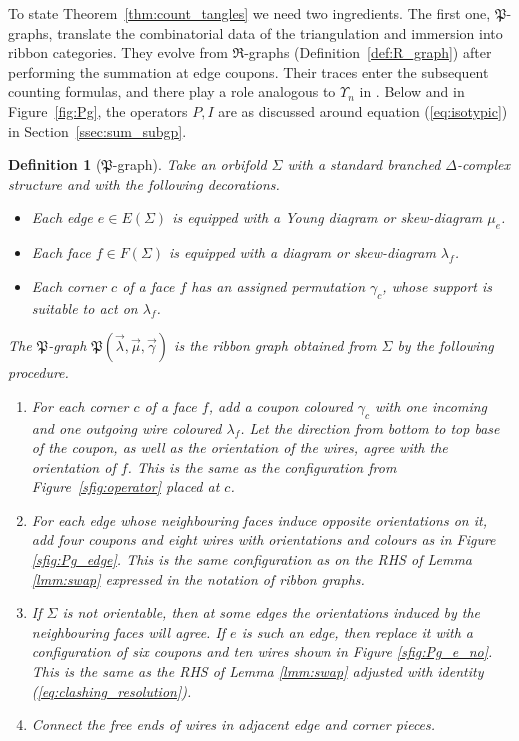 \documentclass{amsart}
\newtheorem{definition}[conjecture]{Definition}
\begin{document}
To state Theorem~\ref{thm:count_tangles} we need two ingredients. The first one, $\mathfrak{P}$-graphs, translate the combinatorial data of the triangulation and immersion into ribbon categories. They evolve from $\mathfrak{R}$-graphs (Definition~\ref{def:R_graph}) after performing the summation at edge coupons. Their traces enter the subsequent counting formulas, and there play a role analogous to $\Upsilon_n$ in \cite[Proposition 5.8]{asymptotic_stats_random_covering_surfaces_MageePuder23}. Below and in Figure~\ref{fig:Pg}, the operators $P,I$ are as discussed around equation (\ref{eq:isotypic}) in Section~\ref{ssec:sum_subgp}.
\begin{definition}[$\mathfrak{P}$-graph]\label{def:P_graph}
Take an orbifold $\Sigma$ with a standard branched $\Delta$-complex structure and with the following decorations.
\begin{itemize}
\item Each edge $e\in E(\Sigma)$ is equipped with a Young diagram or skew-diagram $\mu_e$.
\item Each face $f\in F(\Sigma)$ is equipped with a diagram or skew-diagram $\lambda_f$.
\item Each corner $c$ of a face $f$ has an assigned permutation $\gamma_c$, whose support is suitable to act on $\lambda_f$.
\end{itemize}
The \emph{$\mathfrak{P}$-graph} $\mathfrak{P}(\vec\lambda,\vec\mu,\vec\gamma)$ is the ribbon graph obtained from $\Sigma$ by the following procedure.
\begin{enumerate}
\item\label{sdef:Pg_corner} For each corner $c$ of a face $f$, add a coupon coloured $\gamma_c$ with one incoming and one outgoing wire coloured $\lambda_f$. Let the direction from bottom to top base of the coupon, as well as the orientation of the wires, agree with the orientation of $f$. This is the same as the configuration from Figure~\ref{sfig:operator} placed at $c$.
\item For each edge whose neighbouring faces induce opposite orientations on it, add four coupons and eight wires with orientations and colours as in Figure \ref{sfig:Pg_edge}. This is the same configuration as on the RHS of Lemma \ref{lmm:swap} expressed in the notation of ribbon graphs.
\item\label{sdef:Pg_e_no} If $\Sigma$ is not orientable, then at some edges the orientations induced by the neighbouring faces will agree. If $e$ is such an edge, then replace it with a configuration of six coupons and ten wires shown in Figure \ref{sfig:Pg_e_no}. This is the same as the RHS of Lemma \ref{lmm:swap} adjusted with identity (\ref{eq:clashing_resolution}).
\item Connect the free ends of wires in adjacent edge and corner pieces.
\end{enumerate}
\end{definition}
\end{document}
